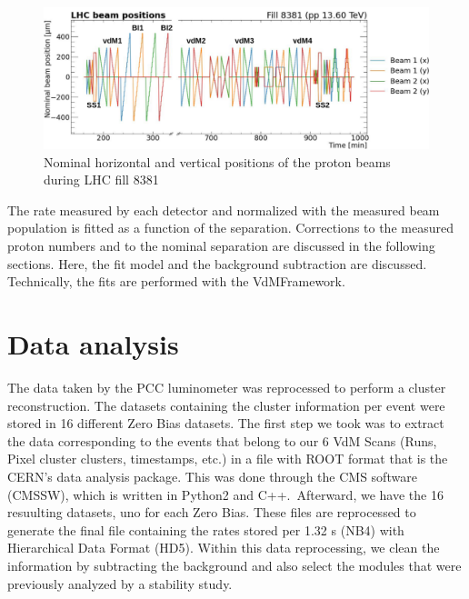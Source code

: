 \begin{center}
  \begin{figure}[h]
    \centering
    \includegraphics[scale=.25]{Chapter4/2022Scanprorgam.png}
    \caption[2022 scan program]{Nominal horizontal and vertical positions of the proton beams during LHC fill 8381}
    \label{scan_prog}
  \end{figure}
\end{center}

The rate measured by each detector and normalized with the measured beam population is
fitted as a function of the separation. Corrections to the measured proton numbers and to
the nominal separation are discussed in the following sections. Here, the fit model and the
background subtraction are discussed. Technically, the fits are performed with the VdMFramework.



\section{Data analysis}

The data taken by the  PCC luminometer was reprocessed to perform a cluster reconstruction. The datasets containing the cluster information per event were stored in 16 different Zero Bias datasets. The first step we took was to extract the data corresponding to the events that belong to our 6 VdM Scans (Runs, Pixel cluster clusters, timestamps, etc.) in a file with ROOT format that is the CERN's data analysis package. This was done through the CMS software (CMSSW), which is written in Python2 and C++.\
Afterward, we have the 16  resuulting datasets, uno for each Zero Bias. These files are reprocessed to generate the final file containing the rates stored per 1.32 s (NB4) with Hierarchical Data Format (HD5). Within this data reprocessing, we clean the information by subtracting the background and also select the modules that were previously analyzed by a stability study.

